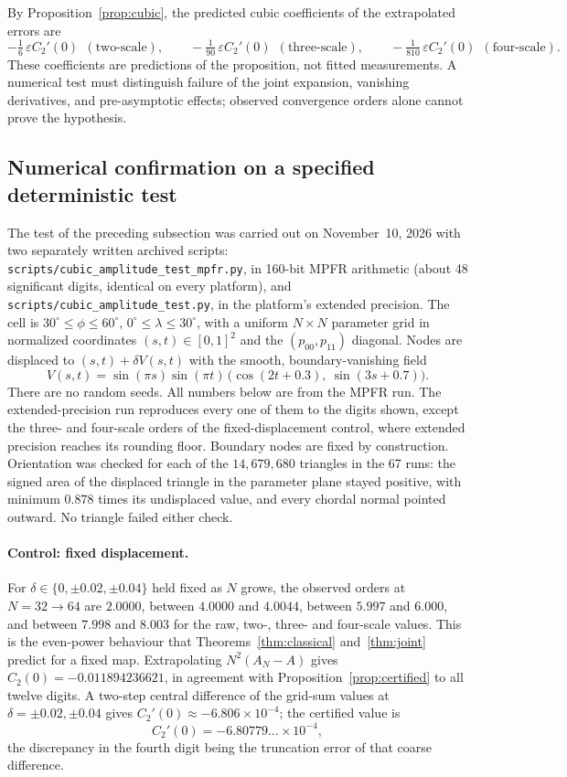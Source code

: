 \documentclass[11pt]{article}
\theoremstyle{remark}
\begin{document}
By Proposition~\ref{prop:cubic}, the predicted cubic coefficients of the extrapolated errors
are
\[
-\tfrac16\,\varepsilon C_2'(0)\ \ (\text{two-scale}),\qquad
-\tfrac1{90}\,\varepsilon C_2'(0)\ \ (\text{three-scale}),\qquad
-\tfrac1{810}\,\varepsilon C_2'(0)\ \ (\text{four-scale}).
\]
These coefficients are predictions of the proposition, not fitted measurements. A numerical test must
distinguish failure of the joint expansion, vanishing derivatives, and pre-asymptotic effects;
observed convergence orders alone cannot prove the hypothesis.

\subsection{Numerical confirmation on a specified deterministic test}\label{sec:numtest}
The test of the preceding subsection was carried out on November~10, 2026 with two separately
written archived scripts: \texttt{scripts/cubic\_amplitude\_test\_mpfr.py}, in 160-bit MPFR
arithmetic (about 48 significant digits, identical on every platform), and
\texttt{scripts/cubic\_amplitude\_test.py}, in the platform's extended precision. The cell is $30^\circ\le\phi\le60^\circ$,
$0^\circ\le\lambda\le30^\circ$, with a uniform $N\times N$ parameter grid in normalized
coordinates $(s,t)\in[0,1]^2$ and the $(p_{00},p_{11})$ diagonal. Nodes are displaced to
$(s,t)+\delta V(s,t)$ with the smooth, boundary-vanishing field
\[
V(s,t)=\sin(\pi s)\sin(\pi t)\,\bigl(\cos(2t+0.3),\ \sin(3s+0.7)\bigr).
\]
There are no random seeds. All numbers below are from the MPFR run. The extended-precision
run reproduces every one of them to the digits shown, except the three- and four-scale orders
of the fixed-displacement control, where extended precision reaches its rounding floor.
Boundary nodes are fixed by construction. Orientation was checked for each of the
$14{,}679{,}680$ triangles in the 67 runs: the signed area of the displaced triangle in the
parameter plane stayed positive, with minimum $0.878$ times its undisplaced value, and every
chordal normal pointed outward. No triangle failed either check.

\paragraph{Control: fixed displacement.}
For $\delta\in\{0,\pm0.02,\pm0.04\}$ held fixed as $N$ grows, the observed orders at
$N=32\to64$ are $2.0000$, between $4.0000$ and $4.0044$, between $5.997$ and $6.000$, and
between $7.998$ and $8.003$ for the raw, two-, three- and four-scale values. This is the even-power behaviour that
Theorems~\ref{thm:classical} and~\ref{thm:joint} predict for a fixed map. Extrapolating
$N^2(A_N-A)$ gives $C_2(0)=-0.011894236621$, in agreement with
Proposition~\ref{prop:certified} to all twelve digits. A two-step central difference of the
grid-sum values at $\delta=\pm0.02,\pm0.04$ gives $C_2'(0)\approx-6.806\times10^{-4}$; the
certified value is
\[
C_2'(0)=-6.80779\ldots\times10^{-4},
\]
the discrepancy in the fourth digit being the truncation error of that coarse difference.
\end{document}
